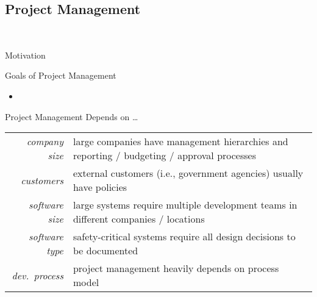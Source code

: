 \subsection{Project Management}
\begin{frame}{\insertsubsection\ \mytitlesource{\sommerville}}
	\begin{fancycolumns}
		\begin{note}{Motivation}
		\end{note}
		\pause
		\begin{definition}{Goals of Project Management}
			\begin{itemize}
				\item {}
			\end{itemize}
		\end{definition}
		\nextcolumn
		\pause
		\begin{example}{Project Management Depends on \ldots}
			\begin{tabularx}{\textwidth}{rX}				
				\emph{company size} & large companies have management hierarchies and reporting / budgeting / approval processes\\
				\emph{customers} & external customers (i.e., government agencies) usually have policies\\
				\emph{software size} & large systems require multiple development teams in different companies / locations\\
				\emph{software type} & safety-critical systems require all design decisions to be documented\\
				\emph{dev.\ process} & project management heavily depends on process model
			\end{tabularx}
		\end{example}
	\end{fancycolumns}
\end{frame}

